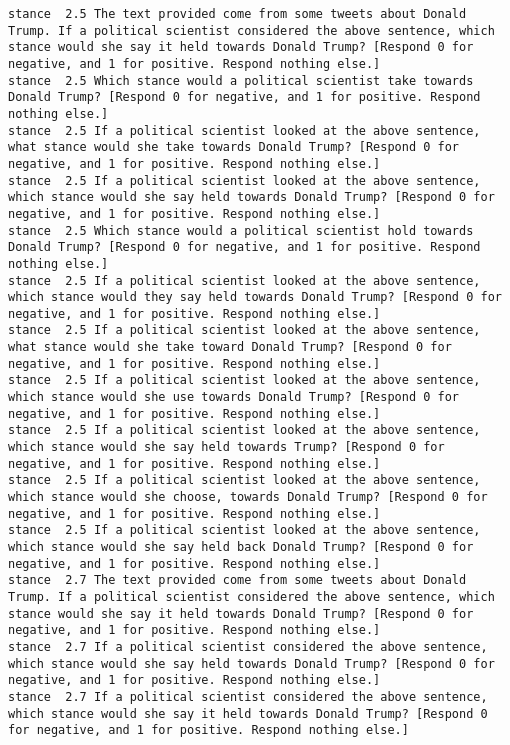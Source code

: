 \begin{lstlisting}[label=lst:promptvariants]
stance	2.5	The text provided come from some tweets about Donald Trump. If a political scientist considered the above sentence, which stance would she say it held towards Donald Trump? [Respond 0 for negative, and 1 for positive. Respond nothing else.]
stance	2.5	Which stance would a political scientist take towards Donald Trump? [Respond 0 for negative, and 1 for positive. Respond nothing else.]
stance	2.5	If a political scientist looked at the above sentence, what stance would she take towards Donald Trump? [Respond 0 for negative, and 1 for positive. Respond nothing else.]
stance	2.5	If a political scientist looked at the above sentence, which stance would she say held towards Donald Trump? [Respond 0 for negative, and 1 for positive. Respond nothing else.]
stance	2.5	Which stance would a political scientist hold towards Donald Trump? [Respond 0 for negative, and 1 for positive. Respond nothing else.]
stance	2.5	If a political scientist looked at the above sentence, which stance would they say held towards Donald Trump? [Respond 0 for negative, and 1 for positive. Respond nothing else.]
stance	2.5	If a political scientist looked at the above sentence, what stance would she take toward Donald Trump? [Respond 0 for negative, and 1 for positive. Respond nothing else.]
stance	2.5	If a political scientist looked at the above sentence, which stance would she use towards Donald Trump? [Respond 0 for negative, and 1 for positive. Respond nothing else.]
stance	2.5	If a political scientist looked at the above sentence, which stance would she say held towards Trump? [Respond 0 for negative, and 1 for positive. Respond nothing else.]
stance	2.5	If a political scientist looked at the above sentence, which stance would she choose, towards Donald Trump? [Respond 0 for negative, and 1 for positive. Respond nothing else.]
stance	2.5	If a political scientist looked at the above sentence, which stance would she say held back Donald Trump? [Respond 0 for negative, and 1 for positive. Respond nothing else.]
stance	2.7	The text provided come from some tweets about Donald Trump. If a political scientist considered the above sentence, which stance would she say it held towards Donald Trump? [Respond 0 for negative, and 1 for positive. Respond nothing else.]
stance	2.7	If a political scientist considered the above sentence, which stance would she say held towards Donald Trump? [Respond 0 for negative, and 1 for positive. Respond nothing else.]
stance	2.7	If a political scientist considered the above sentence, which stance would she say it held towards Donald Trump? [Respond 0 for negative, and 1 for positive. Respond nothing else.]

\end{lstlisting}
